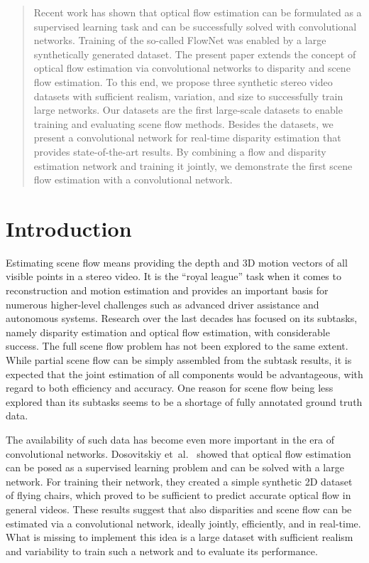\documentclass[10pt,twocolumn,letterpaper]{article}
\begin{document}
\begin{abstract}
Recent work has shown that optical flow estimation can be formulated as a supervised learning task and can be successfully solved with convolutional networks. 
Training of the so-called FlowNet was enabled by a large synthetically generated dataset. The present paper extends the concept of optical flow estimation via convolutional networks to disparity and scene flow estimation. 
To this end, we propose three synthetic stereo video datasets with sufficient realism, variation, and size to successfully train large networks. 
Our datasets are the first large-scale datasets to enable training and evaluating scene flow methods. 
Besides the datasets, we present a convolutional network for real-time disparity estimation that provides state-of-the-art results. By combining a flow and disparity estimation network and training it jointly, we demonstrate the first scene flow estimation with a convolutional network. 
\end{abstract}


\section{Introduction}\label{sec:intro}
Estimating scene flow means providing the depth and 3D motion vectors of all visible points in a stereo video. 
It is the ``royal league'' task when it comes to reconstruction and motion estimation and provides an important basis for numerous higher-level challenges such as advanced driver assistance and autonomous systems.
Research over the last decades has focused on its subtasks, namely disparity estimation and optical flow estimation, with considerable success.  
The full scene flow problem has not been explored to the same extent. 
While partial scene flow can be simply assembled from the subtask results, it is expected that the joint estimation of all components would be advantageous, with regard to both efficiency and accuracy.
One reason for scene flow being less explored than its subtasks seems to be a shortage of fully annotated ground truth data.

The availability of such data has become even more important in the era of convolutional networks. 
Dosovitskiy et~al.~\cite{FlowNet} showed that optical flow estimation can be posed as a supervised learning problem and can be solved with a large network. 
For training their network, they created a simple synthetic 2D dataset of flying chairs, which proved to be sufficient to predict accurate optical flow in general videos. 
These results suggest that also disparities and scene flow can be estimated via a convolutional network, ideally jointly, efficiently, and in real-time.
What is missing to implement this idea is a large dataset with sufficient realism and variability to train such a network and to evaluate its performance. 
\end{document}
